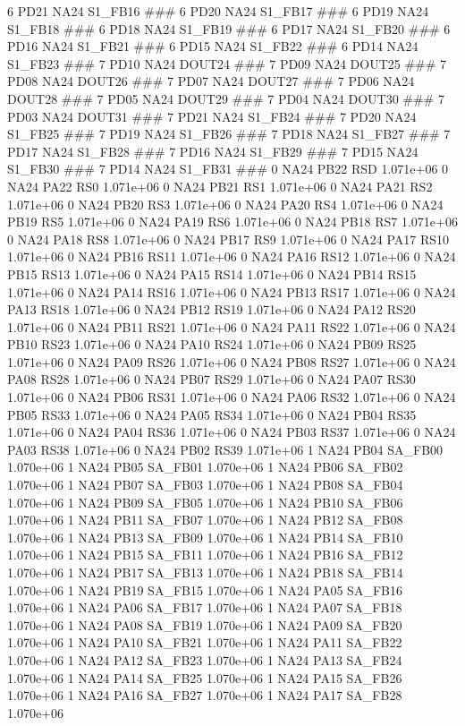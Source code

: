 6 PD21 NA24 S1_FB16 ### 
6 PD20 NA24 S1_FB17 ### 
6 PD19 NA24 S1_FB18 ### 
6 PD18 NA24 S1_FB19 ### 
6 PD17 NA24 S1_FB20 ### 
6 PD16 NA24 S1_FB21 ### 
6 PD15 NA24 S1_FB22 ### 
6 PD14 NA24 S1_FB23 ### 
7 PD10 NA24 DOUT24 ### 
7 PD09 NA24 DOUT25 ### 
7 PD08 NA24 DOUT26 ### 
7 PD07 NA24 DOUT27 ### 
7 PD06 NA24 DOUT28 ### 
7 PD05 NA24 DOUT29 ### 
7 PD04 NA24 DOUT30 ### 
7 PD03 NA24 DOUT31 ### 
7 PD21 NA24 S1_FB24 ### 
7 PD20 NA24 S1_FB25 ### 
7 PD19 NA24 S1_FB26 ### 
7 PD18 NA24 S1_FB27 ### 
7 PD17 NA24 S1_FB28 ### 
7 PD16 NA24 S1_FB29 ### 
7 PD15 NA24 S1_FB30 ### 
7 PD14 NA24 S1_FB31 ### 
0 NA24 PB22 RSD 1.071e+06 
0 NA24 PA22 RS0 1.071e+06 
0 NA24 PB21 RS1 1.071e+06 
0 NA24 PA21 RS2 1.071e+06 
0 NA24 PB20 RS3 1.071e+06 
0 NA24 PA20 RS4 1.071e+06 
0 NA24 PB19 RS5 1.071e+06 
0 NA24 PA19 RS6 1.071e+06 
0 NA24 PB18 RS7 1.071e+06 
0 NA24 PA18 RS8 1.071e+06 
0 NA24 PB17 RS9 1.071e+06 
0 NA24 PA17 RS10 1.071e+06 
0 NA24 PB16 RS11 1.071e+06 
0 NA24 PA16 RS12 1.071e+06 
0 NA24 PB15 RS13 1.071e+06 
0 NA24 PA15 RS14 1.071e+06 
0 NA24 PB14 RS15 1.071e+06 
0 NA24 PA14 RS16 1.071e+06 
0 NA24 PB13 RS17 1.071e+06 
0 NA24 PA13 RS18 1.071e+06 
0 NA24 PB12 RS19 1.071e+06 
0 NA24 PA12 RS20 1.071e+06 
0 NA24 PB11 RS21 1.071e+06 
0 NA24 PA11 RS22 1.071e+06 
0 NA24 PB10 RS23 1.071e+06 
0 NA24 PA10 RS24 1.071e+06 
0 NA24 PB09 RS25 1.071e+06 
0 NA24 PA09 RS26 1.071e+06 
0 NA24 PB08 RS27 1.071e+06 
0 NA24 PA08 RS28 1.071e+06 
0 NA24 PB07 RS29 1.071e+06 
0 NA24 PA07 RS30 1.071e+06 
0 NA24 PB06 RS31 1.071e+06 
0 NA24 PA06 RS32 1.071e+06 
0 NA24 PB05 RS33 1.071e+06 
0 NA24 PA05 RS34 1.071e+06 
0 NA24 PB04 RS35 1.071e+06 
0 NA24 PA04 RS36 1.071e+06 
0 NA24 PB03 RS37 1.071e+06 
0 NA24 PA03 RS38 1.071e+06 
0 NA24 PB02 RS39 1.071e+06 
1 NA24 PB04 SA_FB00 1.070e+06 
1 NA24 PB05 SA_FB01 1.070e+06 
1 NA24 PB06 SA_FB02 1.070e+06 
1 NA24 PB07 SA_FB03 1.070e+06 
1 NA24 PB08 SA_FB04 1.070e+06 
1 NA24 PB09 SA_FB05 1.070e+06 
1 NA24 PB10 SA_FB06 1.070e+06 
1 NA24 PB11 SA_FB07 1.070e+06 
1 NA24 PB12 SA_FB08 1.070e+06 
1 NA24 PB13 SA_FB09 1.070e+06 
1 NA24 PB14 SA_FB10 1.070e+06 
1 NA24 PB15 SA_FB11 1.070e+06 
1 NA24 PB16 SA_FB12 1.070e+06 
1 NA24 PB17 SA_FB13 1.070e+06 
1 NA24 PB18 SA_FB14 1.070e+06 
1 NA24 PB19 SA_FB15 1.070e+06 
1 NA24 PA05 SA_FB16 1.070e+06 
1 NA24 PA06 SA_FB17 1.070e+06 
1 NA24 PA07 SA_FB18 1.070e+06 
1 NA24 PA08 SA_FB19 1.070e+06 
1 NA24 PA09 SA_FB20 1.070e+06 
1 NA24 PA10 SA_FB21 1.070e+06 
1 NA24 PA11 SA_FB22 1.070e+06 
1 NA24 PA12 SA_FB23 1.070e+06 
1 NA24 PA13 SA_FB24 1.070e+06 
1 NA24 PA14 SA_FB25 1.070e+06 
1 NA24 PA15 SA_FB26 1.070e+06 
1 NA24 PA16 SA_FB27 1.070e+06 
1 NA24 PA17 SA_FB28 1.070e+06 
